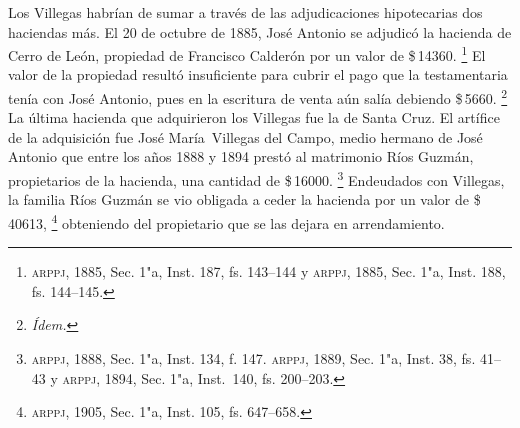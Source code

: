 \documentclass[14pt,twoside,final]{extbook} %
\let\oldfootnote\footnote
\renewcommand\footnote[1]{%
\oldfootnote{\hspace{1mm}#1}}
\begin{document}
Los Villegas habrían de sumar a través de las adjudicaciones hipotecarias dos haciendas más. El 20 de octubre de 1885, José Antonio se adjudicó la hacienda de Cerro de León, propiedad de Francisco Calderón por un valor de \$\,14360.\footnote{\textsc{arppj}, 1885, Sec. 1"a, Inst. 187, fs. 143--144 y \textsc{arppj}, 1885, Sec. 1"a, Inst. 188, fs. 144--145.} El valor de la propiedad resultó insuficiente para cubrir el pago que la testamentaria tenía con José Antonio, pues en la escritura de venta aún salía debiendo \$\,5660.\footnote{\em Ídem.} La última hacienda que adquirieron los Villegas fue la de Santa Cruz. El artífice de la adquisición fue José María~Villegas del Campo, medio hermano de José Antonio que entre los años 1888 y 1894 prestó al matrimonio Ríos Guzmán, propietarios de la hacienda, una cantidad de \$\,16000.\footnote{\textsc{arppj}, 1888, Sec. 1"a, Inst. 134, f. 147. \textsc{arppj}, 1889, Sec. 1"a, Inst. 38, fs. 41--43 y \textsc{arppj}, 1894, Sec. 1"a, Inst.~140, fs. 200--203.} Endeudados con Villegas, la familia Ríos Guzmán se vio obligada a ceder la hacienda por un valor de \$\,40613,\footnote{\textsc{arppj}, 1905, Sec. 1"a, Inst. 105, fs. 647--658.} obteniendo del propietario que se las dejara en arrendamiento.
\end{document}
